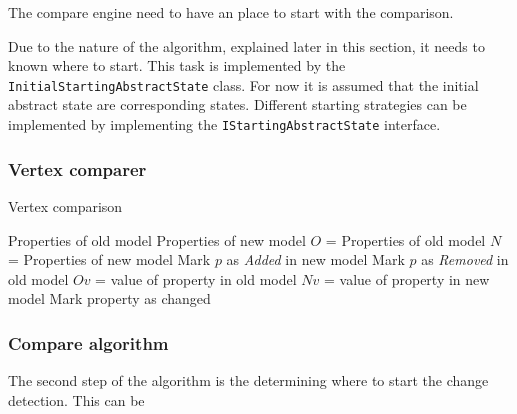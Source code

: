 The compare engine need to have an place to start with the comparison. 


Due to the nature of the algorithm, explained later in this section, it needs to known where to start. This task is implemented by the \verb|InitialStartingAbstractState| class. For now it is assumed that the initial abstract state are corresponding states. Different starting strategies can be implemented by implementing the \verb|IStartingAbstractState| interface. 

\subsubsection{Vertex comparer}
\begin{algorithm}
\caption{Vertex comparison}\label{alg:cap}
\begin{algorithmic}
\Require Properties of old model
\Require Properties of new model
\State $O$ = Properties of old model
\State $N$ = Properties of new model
    \State Mark $p$ as \textit{Added} in new model
\EndFor
{}
    \State Mark $p$ as \textit{Removed} in old model
\EndFor
{}
    \State $Ov$ = value of property in old model
    \State $Nv$ = value of property in new model
       \State Mark property as changed 
    \EndIf
\EndFor
\end{algorithmic}
\end{algorithm}

\subsubsection{Compare algorithm} \label{sec:compare-algorithm}




The second step of the algorithm is the determining where to start the change detection. This can be 








